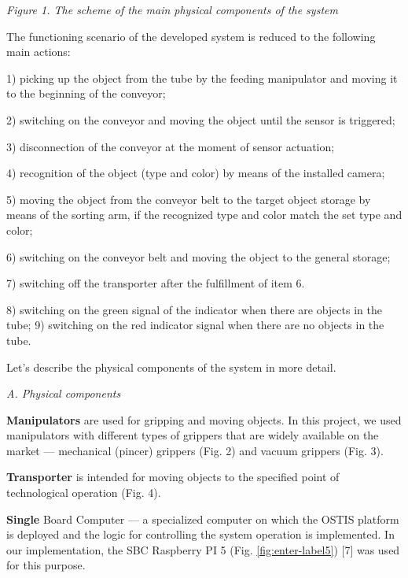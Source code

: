 \documentclass[10pt, letterpaper, twoside]{article}
\begin{document}
\begin{multicols}{2}
\begin{center}
\begin{minipage}{.4\textwidth}
\begin{center}
    \caption{\textsl{Figure 1. The scheme of the main physical components of the system}}
        \end{center}
    \label{fig:enter-label1}
\end{minipage}
\end{center}
The functioning scenario of the developed system is
reduced to the following main actions:

1) picking up the object from the tube by the feeding
manipulator and moving it to the beginning of the
conveyor;

2) switching on the conveyor and moving the object
until the sensor is triggered;

3) disconnection of the conveyor at the moment of
sensor actuation;

4) recognition of the object (type and color) by means
of the installed camera;

5) moving the object from the conveyor belt to the
target object storage by means of the sorting arm,
if the recognized type and color match the set type
and color;

6) switching on the conveyor belt and moving the
object to the general storage;

7) switching off the transporter after the fulfillment of
item 6.

8) switching on the green signal of the indicator when
there are objects in the tube;
9) switching on the red indicator signal when there are
no objects in the tube.

Let’s describe the physical components of the system
in more detail.
\vspace{3mm}

\textsl{A. Physical components}
\vspace{3mm}

\textbf{Manipulators} are used for gripping and moving objects.
In this project, we used manipulators with different
types of grippers that are widely available on the market
— mechanical (pincer) grippers (Fig. 2) and vacuum
grippers (Fig. 3).

\textbf{Transporter} is intended for moving objects to the
specified point of technological operation (Fig. 4).

\textbf{Single} Board Computer — a specialized computer
on which the OSTIS platform is deployed and the logic
for controlling the system operation is implemented. In
our implementation, the SBC Raspberry PI 5 (Fig. \ref{fig:enter-label5}) [7]
was used for this purpose.


\end{multicols}
\end{document}
